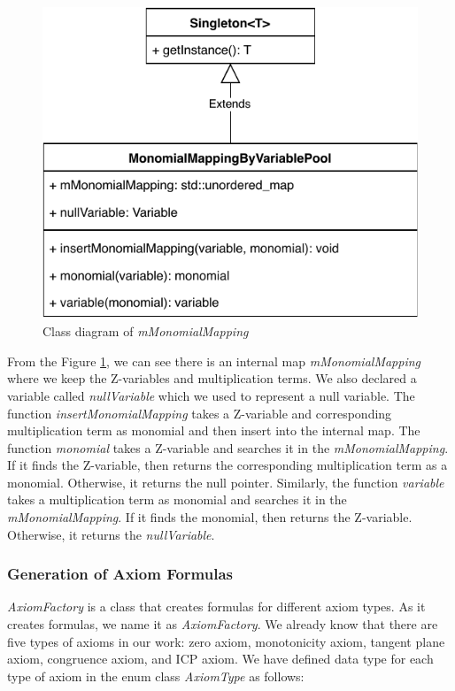 \begin{figure}[ht!]
  \centering
  \includegraphics[width=0.6\linewidth]{./figures/MonomialMappingByVariablePool.pdf}
  \caption{Class diagram of \textit{mMonomialMapping}}
  \label{fig:class_diagram_of_mMonomialMapping}
\end{figure}

\noindent From the Figure \ref{fig:class_diagram_of_mMonomialMapping}, we can see there is an internal map \textit{mMonomialMapping} where we keep the Z-variables and multiplication terms.
We also declared a variable called \textit{nullVariable} which we used to represent a null variable.
The function \textit{insertMonomialMapping} takes a Z-variable and corresponding multiplication term as monomial and then insert into the internal map.
The function \textit{monomial} takes a Z-variable and searches it in the \textit{mMonomialMapping}.
If it finds the Z-variable, then returns the corresponding multiplication term as a monomial.
Otherwise, it returns the null pointer.
Similarly, the function \textit{variable} takes a multiplication term as monomial and searches it in the \textit{mMonomialMapping}.
If it finds the monomial, then returns the Z-variable.
Otherwise, it returns the \textit{nullVariable}.

\subsubsection{Generation of Axiom Formulas}
\label{subsubsec:Generation_of_Axiom_Formulas}
\textit{AxiomFactory} is a class that creates formulas for different axiom types.
As it creates formulas, we name it as \textit{AxiomFactory}.
We already know that there are five types of axioms in our work: zero axiom, monotonicity axiom, tangent plane axiom, congruence axiom, and ICP axiom.
We have defined data type for each type of axiom in the enum class \textit{AxiomType} as follows:

